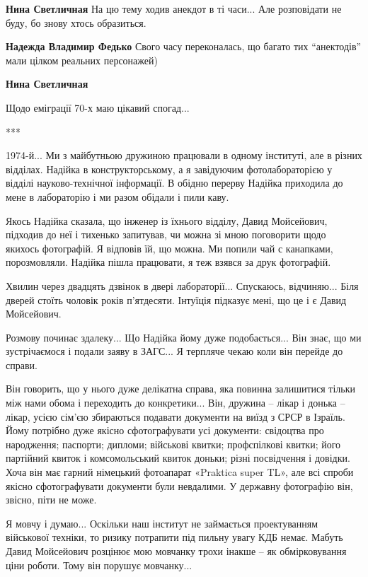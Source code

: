 \begin{itemize}
\begin{itemize}
\begin{itemize}
\textbf{Нина Светличная} На цю тему ходив анекдот в ті часи... Але розповідати не буду, бо знову хтось образиться.

\textbf{Надежда Владимир Федько} Свого часу переконалась, що багато тих \enquote{анектодів} мали цілком реальних персонажей)

\textbf{Нина Светличная} 

Щодо еміграції 70-х маю цікавий спогад...

***

1974-й... Ми з майбутньою дружиною працювали в одному інституті, але в різних
відділах. Надійка в конструкторському, а я завідуючим фотолабораторією у
відділі науково-технічної інформації. В обідню перерву Надійка приходила до
мене в лабораторію і ми разом обідали і пили каву.

Якось Надійка сказала, що інженер із їхнього відділу, Давид Мойсейович,
підходив до неї і тихенько запитував, чи можна зі мною поговорити щодо якихось
фотографій. Я відповів їй, що можна. Ми попили чай с канапками, порозмовляли.
Надійка пішла працювати, я теж взявся за друк фотографій.

Хвилин через двадцять дзвінок в двері лабораторії... Спускаюсь, відчиняю... Біля
дверей стоїть чоловік років п’ятдесяти. Інтуїція підказує мені, що це і є Давид
Мойсейович.

Розмову починає здалеку... Що Надійка йому дуже подобається... Він знає, що ми
зустрічаємося і подали заяву в ЗАГС... Я терпляче чекаю коли він перейде до
справи.

Він говорить, що у нього дуже делікатна справа, яка повинна залишитися тільки
між нами обома і переходить до конкретики... Він, дружина – лікар і донька –
лікар, усією сім’єю збираються подавати документи на виїзд з СРСР в Ізраїль.
Йому потрібно дуже якісно сфотографувати усі документи: свідоцтва про
народження; паспорти; дипломи; військові квитки; профспілкові квитки; його
партійний квиток і комсомольський квиток доньки; різні посвідчення і довідки.
Хоча він має гарний німецький фотоапарат «Praktica super TL», але всі спроби
якісно сфотографувати документи були невдалими. У державну фотографію він,
звісно, піти не може.

Я мовчу і думаю... Оскільки наш інститут не займається проектуванням військової
техніки, то ризику потрапити під пильну увагу КДБ немає. Мабуть Давид
Мойсейович розцінює мою мовчанку трохи інакше – як обмірковування ціни роботи.
Тому він порушує мовчанку...


\end{itemize}
\end{itemize}
\end{itemize}
